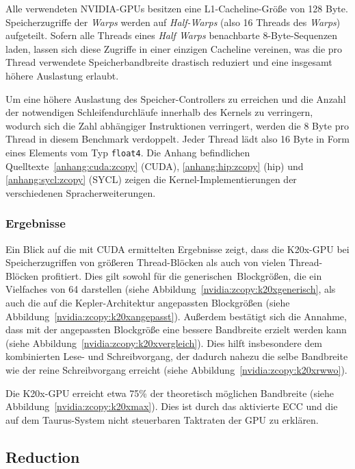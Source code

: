 Alle verwendeten NVIDIA-GPUs besitzen eine L1-Cacheline-Größe von \num{128}
Byte. Speicherzugriffe der \textit{Warps} werden auf \textit{Half-Warps} (also
\num{16} Threads des \textit{Warps}) aufgeteilt. Sofern alle Threads eines
\textit{Half Warps} benachbarte \num{8}-Byte-Sequenzen laden, lassen sich diese
Zugriffe in einer einzigen Cacheline vereinen, was die pro Thread verwendete
Speicherbandbreite drastisch reduziert und eine insgesamt höhere Auslastung
erlaubt.

Um eine höhere Auslastung des Speicher-Controllers zu erreichen und die Anzahl
der notwendigen Schleifendurchläufe innerhalb des Kernels zu verringern, wodurch
sich die Zahl abhängiger Instruktionen verringert, werden die \num{8} Byte pro
Thread in diesem Benchmark verdoppelt. Jeder Thread lädt also \num{16} Byte in
Form eines Elements vom Typ \texttt{float4}. Die Anhang befindlichen
Quelltexte~\ref{anhang:cuda:zcopy} (CUDA), \ref{anhang:hip:zcopy} (\gls{hip})
und \ref{anhang:sycl:zcopy} (SYCL) zeigen die Kernel-Implementierungen der
verschiedenen Spracherweiterungen.

\subsubsection{Ergebnisse}

Ein Blick auf die mit CUDA ermittelten Ergebnisse zeigt, dass die K20x-GPU bei
Speicherzugriffen von größeren Thread-Blöcken als auch von vielen Thread-Blöcken
profitiert. Dies gilt sowohl für die \glqq generischen\grqq\ Blockgrößen, die
ein Vielfaches von \num{64} darstellen (siehe 
Abbildung~\ref{nvidia:zcopy:k20xgenerisch}, als auch die auf die
Kepler-Architektur angepassten Blockgrößen (siehe
Abbildung~\ref{nvidia:zcopy:k20xangepasst}). Außerdem bestätigt sich die
Annahme, dass mit der angepassten Blockgröße eine bessere Bandbreite erzielt
werden kann (siehe Abbildung~\ref{nvidia:zcopy:k20xvergleich}). Dies hilft
insbesondere dem kombinierten Lese- und Schreibvorgang, der dadurch nahezu die
selbe Bandbreite wie der reine Schreibvorgang erreicht (siehe
Abbildung~\ref{nvidia:zcopy:k20xrwwo}).

Die K20x-GPU erreicht etwa 75\% der theoretisch möglichen Bandbreite (siehe
Abbildung~\ref{nvidia:zcopy:k20xmax}). Dies ist durch das aktivierte ECC und
die auf dem Taurus-System nicht steuerbaren Taktraten der GPU zu erklären.

\subsection{Reduction}

